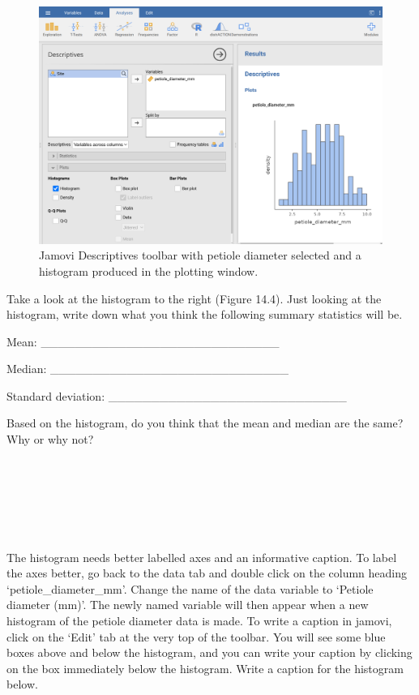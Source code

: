 \documentclass[
]{scrbook}
\begin{document}
\begin{figure}
\includegraphics[width=1\linewidth]{img/lilypad_histogram} \caption{Jamovi Descriptives toolbar with petiole diameter selected and a histogram produced in the plotting window.}\label{fig:unnamed-chunk-52}
\end{figure}

Take a look at the histogram to the right (Figure 14.4).
Just looking at the histogram, write down what you think the following summary statistics will be.

Mean: \_\_\_\_\_\_\_\_\_\_\_\_\_\_\_\_\_\_\_\_\_\_\_\_\_\_\_\_

Median: \_\_\_\_\_\_\_\_\_\_\_\_\_\_\_\_\_\_\_\_\_\_\_\_\_\_\_\_

Standard deviation: \_\_\_\_\_\_\_\_\_\_\_\_\_\_\_\_\_\_\_\_\_\_\_\_\_\_\_\_

Based on the histogram, do you think that the mean and median are the same? Why or why not?

\begin{verbatim}






\end{verbatim}

The histogram needs better labelled axes and an informative caption.
To label the axes better, go back to the data tab and double click on the column heading `petiole\_diameter\_mm'.
Change the name of the data variable to `Petiole diameter (mm)'.
The newly named variable will then appear when a new histogram of the petiole diameter data is made.
To write a caption in jamovi, click on the `Edit' tab at the very top of the toolbar.
You will see some blue boxes above and below the histogram, and you can write your caption by clicking on the box immediately below the histogram.
Write a caption for the histogram below.
\end{document}
